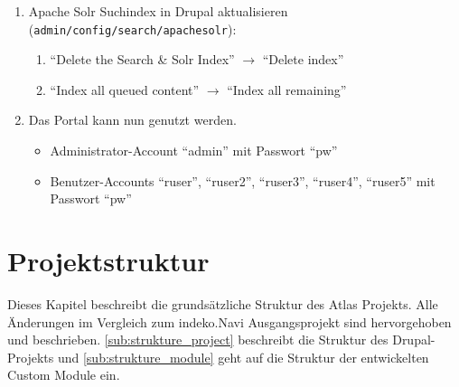 \begin{enumerate}
	\item Apache Solr Suchindex in Drupal aktualisieren (\lstinline|admin/config/search/apachesolr|):
	\begin{enumerate}
		\item \enquote{Delete the Search \& Solr Index} $\rightarrow$ \enquote{Delete index}

		\item \enquote{Index all queued content}  $\rightarrow$ \enquote{Index all remaining}
	\end{enumerate}

	\item Das Portal kann nun genutzt werden.
	\begin{itemize}
		\item Administrator-Account \enquote{admin} mit Passwort \enquote{pw}
		\item Benutzer-Accounts \enquote{ruser}, \enquote{ruser2}, \enquote{ruser3}, \enquote{ruser4}, \enquote{ruser5}  mit Passwort \enquote{pw}
	\end{itemize}
\end{enumerate}



\section{Projektstruktur}
Dieses Kapitel beschreibt die grundsätzliche Struktur des Atlas Projekts. Alle Änderungen im Vergleich zum \acrshort{indeko}.Navi Ausgangsprojekt sind hervorgehoben und beschrieben. \cref{sub:strukture_project} beschreibt die Struktur des Drupal-Projekts und \cref{sub:strukture_module} geht auf die Struktur der entwickelten Custom Module ein.


